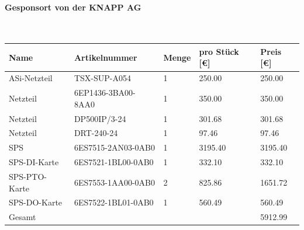 \paragraph{Gesponsort von der KNAPP AG}\mbox{}\\
\begin{table}[H]
    \begin{tabular}{lllll}
    Name                & Artikelnummer                          & Menge & pro Stück {[}€{]} & Preis {[}€{]} \\ \hline
    ASi-Netzteil        & TSX-SUP-A054                           & 1     & 250.00            & 250.00        \\
    Netzteil            & 6EP1436-3BA00-8AA0                    & 1     & 350.00            & 350.00        \\
    Netzteil            & DP500IP/3-24                          & 1     & 301.68            & 301.68        \\
    Netzteil            & DRT-240-24                            & 1     & 97.46             & 97.46         \\
    SPS                 & 6ES7515-2AN03-0AB0                    & 1     & 3195.40           & 3195.40       \\
    SPS-DI-Karte        & 6ES7521-1BL00-0AB0                    & 1     & 332.10            & 332.10        \\
    SPS-PTO-Karte       & 6ES7553-1AA00-0AB0                    & 2     & 825.86            & 1651.72       \\
    SPS-DO-Karte        & 6ES7522-1BL01-0AB0                    & 1     & 560.49            & 560.49        \\ \hline
    Gesamt              &                                        &       &                   & 5912.99       
    \end{tabular}
\end{table}
